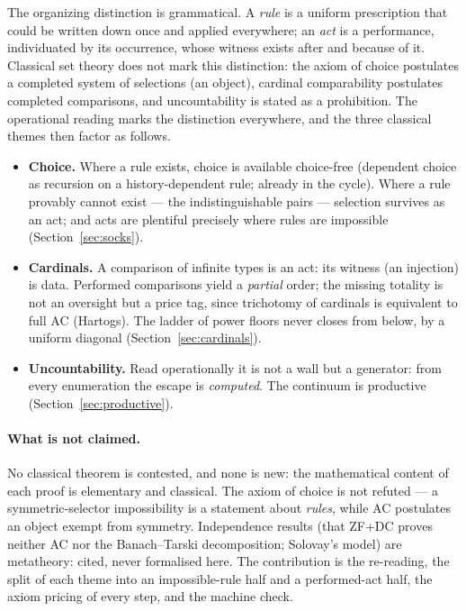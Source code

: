 \documentclass[11pt]{article}
\theoremstyle{remark}
\begin{document}
The organizing distinction is grammatical.  A \emph{rule} is a uniform
prescription that could be written down once and applied everywhere; an
\emph{act} is a performance, individuated by its occurrence, whose
witness exists after and because of it.  Classical set theory does not
mark this distinction: the axiom of choice postulates a completed system
of selections (an object), cardinal comparability postulates completed
comparisons, and uncountability is stated as a prohibition.  The
operational reading marks the distinction everywhere, and the three
classical themes then factor as follows.

\begin{itemize}
\item \textbf{Choice.}  Where a rule exists, choice is available
  choice-free (dependent choice as recursion on a history-dependent
  rule; already in the cycle).  Where a rule provably cannot exist ---
  the indistinguishable pairs --- selection survives as an act; and acts
  are plentiful precisely where rules are impossible
  (Section~\ref{sec:socks}).
\item \textbf{Cardinals.}  A comparison of infinite types is an act:
  its witness (an injection) is data.  Performed comparisons yield a
  \emph{partial} order; the missing totality is not an oversight but a
  price tag, since trichotomy of cardinals is equivalent to full AC
  (Hartogs).  The ladder of power floors never closes from below, by a
  uniform diagonal (Section~\ref{sec:cardinals}).
\item \textbf{Uncountability.}  Read operationally it is not a wall but
  a generator: from every enumeration the escape is \emph{computed}.
  The continuum is productive (Section~\ref{sec:productive}).
\end{itemize}

\paragraph{What is not claimed.}  No classical theorem is contested, and
none is new: the mathematical content of each proof is elementary and
classical.  The axiom of choice is not refuted --- a symmetric-selector
impossibility is a statement about \emph{rules}, while AC postulates an
object exempt from symmetry.  Independence results (that ZF+DC proves
neither AC nor the Banach--Tarski decomposition; Solovay's model) are
metatheory: cited, never formalised here.  The contribution is the
re-reading, the split of each theme into an impossible-rule half and a
performed-act half, the axiom pricing of every step, and the machine
check.
\end{document}
